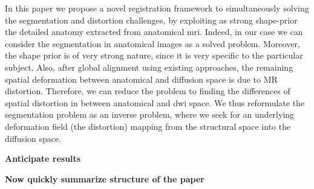 In this paper we propose a novel registration framework to simultaneously
solving the segmentation and distortion challenges, by exploiting as strong 
shape-prior the detailed anatomy extracted from anatomical \ac{mri}. Indeed, in our case we can consider the segmentation in anatomical images as a solved problem. Moreover, the shape prior is of very strong nature, since it is very specific to the particular subject. Also, after global alignment using existing approaches, the remaining spatial deformation between anatomical and diffusion space is due to MR distortion. Therefore, we can reduce the problem to finding the differences of spatial distortion in between anatomical and \ac{dwi} space. We thus reformulate the segmentation problem as an inverse problem, where
we seek for an underlying deformation field (the distortion) mapping 
from the structural space into the diffusion space.

\textbf{Anticipate results}

\textbf{Now quickly summarize structure of the paper}